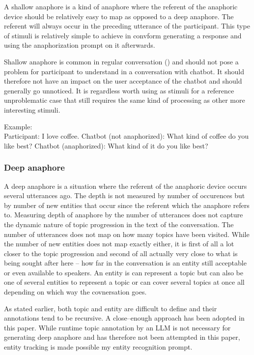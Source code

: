 \documentclass[12pt]{report}
\begin{document}
{A shallow anaphore is a kind of anaphore
where the referent of the anaphoric device
should be relatively easy to map
as opposed to a deep anaphore.
The referent will always occur
in the preceding utterance of the participant.
This type of stimuli is relatively simple to achieve
in convform
generating a response
and using the anaphorization prompt on it afterwards.

Shallow anaphore is common in regular conversation ()
and should not pose a problem for participant to understand
in a conversation with chatbot.
It should therefore not have an impact
on the user acceptance of the chatbot
and should generally go unnoticed.
It is regardless worth using as stimuli
for a reference unproblematic case
that still requires the same kind of processing
as other more interesting stimuli.

Example: \\
Participant: I love coffee.
Chatbot (not anaphorized): What kind of coffee do you like best?
Chatbot (anaphorized): What kind of it do you like best?

\subsubsection{Deep anaphore}

A deep anaphore is a situation
where the referent of the anaphoric device
occurs several utterances ago.
The depth is not measured by number of occurences
but by number of new entities that occur
since the referent which the anaphore refers to.
Measuring depth of anaphore by the number of utterances
does not capture the dynamic nature
of topic progression in the text of the conversation.
The number of utterances does not map
on how many topics have been visited.
While the number of new entities does not
map exactly either,
it is first of all a lot closer to the topic progression
and second of all actually very close to
what is being sought after here –
how far in the conversation is an entity
still acceptable or even available to speakers.
An entity is can represent a topic
but can also be one of several entities to represent a topic
or can cover several topics at once
all depending on which way the covnersation goes.

\par
As stated earlier,
both topic and entity are difficult to define
and their annotations tend to be recursive.
A close–enough approach has been adopted in this paper.
While runtime topic annotation by an LLM
is not necessary for generating deep anaphore
and has therefore not been attempted in this paper,
entity tracking is made possible my
entity recognition prompt.

}
\end{document}
